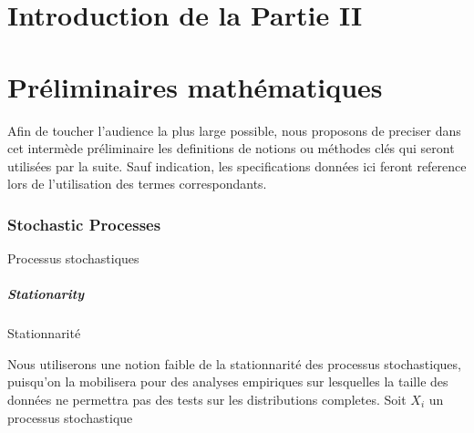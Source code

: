


\chapter*{Introduction de la Partie II}


























\chapter*{Préliminaires mathématiques}


Afin de toucher l'audience la plus large possible, nous proposons de preciser dans cet intermède préliminaire les definitions de notions ou méthodes clés qui seront utilisées par la suite. Sauf indication, les specifications données ici feront reference lors de l'utilisation des termes correspondants.



\subsection*{Stochastic Processes}{Processus stochastiques}

\paragraph{Stationarity}{Stationnarité}

Nous utiliserons une notion faible de la stationnarité des processus stochastiques, puisqu'on la mobilisera pour des analyses empiriques sur lesquelles la taille des données ne permettra pas des tests sur les distributions completes. Soit $X_i$ un processus stochastique



